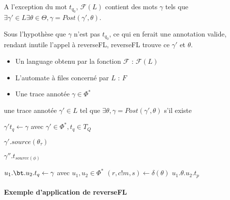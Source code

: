 A l'exception du mot $t_{q_0}$, $\mathcal{F}(L)$ contient des mots $\gamma$ tels que $\exists \gamma'\in L \exists \theta\in\Theta, \gamma=Post(\gamma',\theta)$.

Sous l'hypothèse que $\gamma$ n'est pas $t_{q_0}$, ce qui en ferait une annotation valide, rendant inutile l'appel à reverseFL, reverseFL trouve ce $\gamma'$ et $\theta$.

\begin{algo}[reverseFL]
    \begin{algorithmic}[1]
        \REQUIRE
        \begin{itemize}
            \item Un language obtenu par la fonction $\mathcal{F}$ : $\mathcal{F}(L)$
            \item L'automate à files concerné par $L$  : $F$
            \item Une trace annotée $\gamma\in\Phi^*$
        \end{itemize}
        \ENSURE une trace annotée $\gamma'\in L$ tel que $\exists \theta, \gamma=Post(\gamma',\theta)$ s'il existe

          \STATE $\gamma' t_q \leftarrow \gamma$ avec $\gamma'\in\Phi^*,t_q\in T_Q$

              \RETURN $\gamma'.source(\theta_\tau)$
            \ENDIF
          \ENDIF

              \RETURN $\gamma''.t_{source(\phi)}$
            \ENDIF

              \STATE $u_1.\bt.u_2.t_q \leftarrow \gamma$ avec $u_1,u_2 \in \Phi^*$
              \STATE $(r, c!m, s)\leftarrow\delta(\theta)$
                  \RETURN $u_1.\theta.u_2.t_p$
                \ENDIF
              \ENDFOR
            \ENDFOR
          \ENDIF
        \ENDIF
    \end{algorithmic}
\end{algo}


\paragraph{Exemple d'application de reverseFL}

